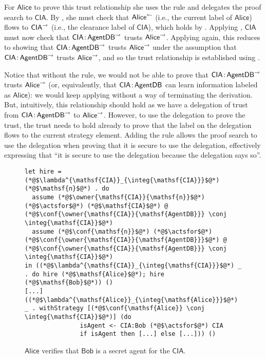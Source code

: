 For $\mathsf{Alice}$ to prove this trust relationship she uses the  rule and delegates the proof search to $\mathsf{CIA}$. By , she must check that $\mathsf{Alice}^{\leftarrow}$ (i.e., the current label of $\mathsf{Alice}$) flows to $\mathsf{CIA}^{\rightarrow}$ (i.e., the clearance label of $\mathsf{CIA}$), which holds by . Applying , $\mathsf{CIA}$ must now check that $\mathsf{CIA} \colon \!\mathsf{AgentDB}^{\rightarrow}$ trusts $\mathsf{Alice}^{\rightarrow}$. Applying  again, this reduces to showing that $\mathsf{CIA} \colon \!\mathsf{AgentDB}^{\rightarrow}$ trusts $\mathsf{Alice}^{\rightarrow}$ under the assumption that $\mathsf{CIA} \colon \!\mathsf{AgentDB}^{\rightarrow}$ trusts $\mathsf{Alice}^{\rightarrow}$, and so the trust relationship is established using .

Notice that without the  rule, we would not be able to prove that $\mathsf{CIA} \colon \!\mathsf{AgentDB}^{\rightarrow}$ trusts $\mathsf{Alice}^{\rightarrow}$ (or, equivalently, that $\mathsf{CIA} \colon \!\mathsf{AgentDB}$ can learn information labeled as $\mathsf{Alice}$): we would keep applying  without a way of terminating the derivation. But, intuitively, this relationship should hold as we have a delegation of trust from $\mathsf{CIA} \colon \!\mathsf{AgentDB}^{\rightarrow}$ to $\mathsf{Alice}^{\rightarrow}$. However, to use the delegation to prove the trust, the trust needs to hold already to prove that the label on the delegation flows to the current strategy element. Adding the  rule allows the proof search to use the delegation when proving that it is secure to use the delegation, effectively expressing that ``it is secure to use the delegation because the delegation says so''.

\begin{figure}
\centering
\begin{lstlisting}
let hire = (*@$\lambda^{\mathsf{CIA}}_{\integ{\mathsf{CIA}}}$@*) (*@$\mathsf{n}$@*) . do
  assume (*@$\owner{\mathsf{CIA}}{\mathsf{n}}$@*) (*@$\actsfor$@*) (*@$\mathsf{CIA}$@*) @ (*@$\conf{\owner{\mathsf{CIA}}{\mathsf{AgentDB}}} \conj \integ{\mathsf{CIA}}$@*)
  assume (*@$\conf{\mathsf{n}}$@*) (*@$\actsfor$@*) (*@$\conf{\owner{\mathsf{CIA}}{\mathsf{AgentDB}}}$@*) @ (*@$\conf{\owner{\mathsf{CIA}}{\mathsf{AgentDB}}} \conj \integ{\mathsf{CIA}}$@*)
in ((*@$\lambda^{\mathsf{CIA}}_{\integ{\mathsf{CIA}}}$@*) _ . do hire (*@$\mathsf{Alice}$@*); hire (*@$\mathsf{Bob}$@*)) ()
[...]
((*@$\lambda^{\mathsf{Alice}}_{\integ{\mathsf{Alice}}}$@*) _ . withStrategy [(*@$\conf{\mathsf{Alice}} \conj \integ{\mathsf{CIA}}$@*)] (do
               isAgent <- CIA:Bob (*@$\actsfor$@*) CIA
               if isAgent then [...] else [...])) ()
\end{lstlisting}
\caption{$\mathsf{Alice}$ verifies that $\mathsf{Bob}$ is a secret agent for the $\mathsf{CIA}$.}
\label{fig:govt-alice-checks-bob}
\end{figure}